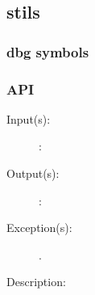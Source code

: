 %
%
%
%
%              

\subsection{stils}
\label{stils}

\subsubsection{dbg symbols}

\subsubsection{API}
\begin{description}
\label{stils_}
\item[{\cfunc[]{stils\_}{}}: ]
	\begin{description}\item[]
	\item[Input(s): ]
		\begin{description}\item[]
		\item[: ]
		\end{description}
	\item[Output(s): ]
		\begin{description}\item[]
		\item[: ]
		\end{description}
	\item[Exception(s): ]
		\begin{description}\item[]
		\item[.]
		\end{description}
	\item[Description: ]
	\end{description}
\end{description}
